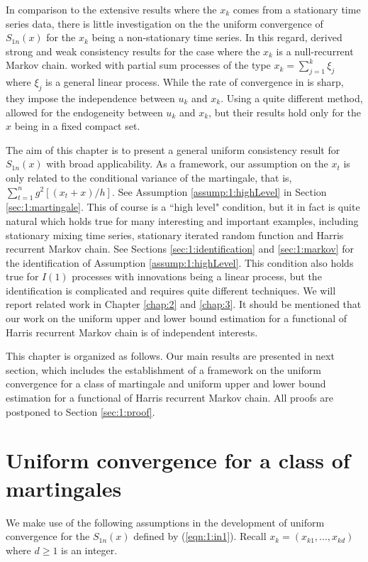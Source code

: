 In comparison to the extensive results where the  $x_k$ comes from a stationary time series data, there is little investigation on the the uniform convergence of $S_{1n}(x)$ for the $x_k$ being a non-stationary time series. In this regard, \cite{gaolitjostheim2011} derived strong and weak consistency results for the case where the $x_k$ is a null-recurrent Markov chain. \cite{wangwang2012} worked  with partial sum processes of the type $x_k=\sum_{j=1}^k\xi_j$ where $\xi_j$ is a general linear process. While the rate of convergence   in \cite{gaolitjostheim2011} is sharp,  they impose the independence between $u_k$ and $x_k$. Using a quite different method, \cite{wangwang2012} allowed for the endogeneity between $u_k$ and $x_k$, but their results hold  only for the $x$ being in a fixed compact set.

The aim of this chapter is to present a general uniform consistency  result for $S_{1n}(x)$ with broad applicability. As a framework,  our  assumption on the $x_t$ is only related to the conditional variance of the  martingale, that is, $ \sum_{t=1}^n g^2[(x_t+x)/h]$. See Assumption \ref{assump:1:highLevel} in Section \ref{sec:1:martingale}.
This of course is a ``high level" condition, but it in fact is quite natural which holds true for many interesting and important examples, including stationary mixing time series, stationary  iterated random function and Harris  recurrent Markov chain. See Sections \ref{sec:1:identification} and \ref{sec:1:markov} for the identification of Assumption \ref{assump:1:highLevel}. This condition also holds true for $I(1)$ processes with innovations being a linear process, but the identification is complicated and requires quite different techniques. We will report related work in Chapter \ref{chap:2} and \ref{chap:3}. It should be mentioned that our work on the uniform upper and lower  bound estimation for a functional of Harris recurrent Markov chain is of independent interests.


This chapter is organized as follows. Our main results are presented in next section, which includes the establishment of a framework on the uniform convergence for a class of martingale and uniform upper and lower  bound estimation for a functional of Harris recurrent Markov chain. All proofs are postponed to Section \ref{sec:1:proof}. 


\section{Uniform convergence for a class of martingales} 
We make use of the following assumptions in the development of  uniform convergence for the $S_{1n}(x)$ defined by (\ref {eqn:1:in1}).
Recall $x_k=(x_{k1},..., x_{kd})$ where $ d\ge 1$ is an integer.

